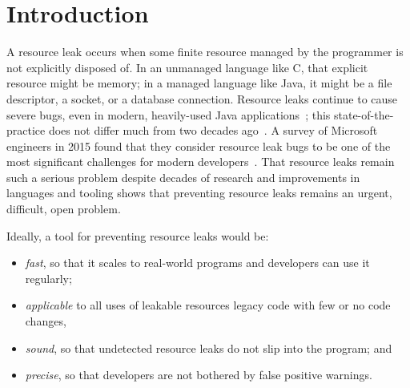 \section{Introduction}
\label{sec:intro}


A resource leak occurs when some finite resource managed by the
programmer is not explicitly disposed of. In an unmanaged language
like C, that explicit resource might be memory; in a managed language
like Java, it might be a file descriptor, a socket, or a database
connection.  Resource leaks continue to cause severe bugs, even in
modern, heavily-used Java applications~\cite{ghanavati2020memory};
this state-of-the-practice does not differ much from two decades
ago~\cite{WeimerN04}.  A survey of Microsoft engineers in 2015 found
that they consider resource leak bugs to be one of the most
significant challenges for modern developers~\cite{LoNZ2015}.  That
resource leaks remain such a serious problem despite decades of
research and improvements in languages and tooling shows that
preventing resource leaks remains an urgent, difficult, open problem.


Ideally, a tool for preventing resource leaks would be:
\begin{itemize}
\item \emph{fast}, so that it scales to real-world programs and
  developers can use it regularly;
\item \emph{applicable} to all uses of leakable resources legacy code with few or no code changes,
\item \emph{sound}, so that undetected resource leaks do not slip into
  the program; and
\item \emph{precise}, so that developers are not bothered by false positive
  warnings.
\end{itemize}


